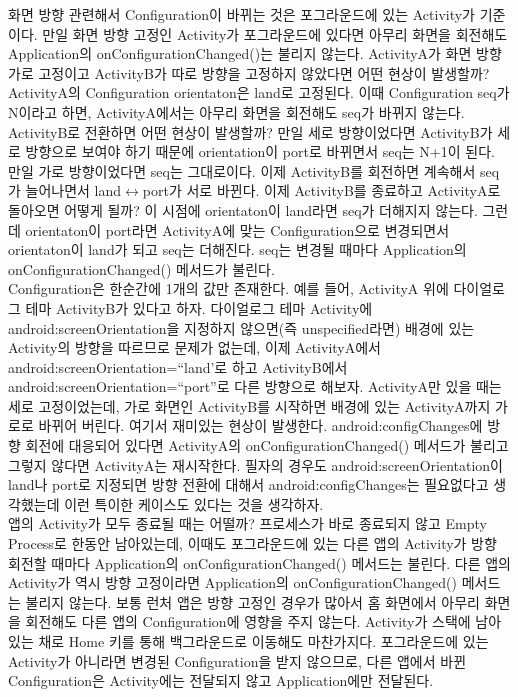 화면 방향 관련해서 Configuration이 바뀌는 것은 포그라운드에 있는 Activity가 기준이다. 
만일 화면 방향 고정인 Activity가 포그라운드에 있다면 아무리 화면을 회전해도 Application의 onConfigurationChanged()는 불리지 않는다. 
ActivityA가 화면 방향 가로 고정이고 ActivityB가 따로 방향을 고정하지 않았다면 어떤 현상이 발생할까? ActivityA의 Configuration orientaton은 land로 고정된다. 
이때 Configuration seq가 N이라고 하면, ActivityA에서는 아무리 화면을 회전해도 seq가 바뀌지 않는다. ActivityB로 전환하면 어떤 현상이 발생할까? 
만일 세로 방향이었다면 ActivityB가 세로 방향으로 보여야 하기 때문에 orientation이 port로 바뀌면서 seq는 N+1이 된다. 
만일 가로 방향이었다면 seq는 그대로이다. 이제 ActivityB를 회전하면 계속해서 seq가 늘어나면서 land$\leftrightarrow$port가 서로 바뀐다. 
이제 ActivityB를 종료하고 ActivityA로 돌아오면 어떻게 될까? 이 시점에 orientaton이 land라면 seq가 더해지지 않는다. 
그런데 orientaton이 port라면 ActivityA에 맞는 Configuration으로 변경되면서 orientaton이 land가 되고 seq는 더해진다. 
seq는 변경될 때마다 Application의 onConfigurationChanged() 메서드가 불린다.\\

Configuration은 한순간에 1개의 값만 존재한다. 예를 들어, ActivityA 위에 다이얼로그 테마 ActivityB가 있다고 하자. 
다이얼로그 테마 Activity에 android:screenOrientation을 지정하지 않으면(즉 unspecified라면) 배경에 있는 Activity의 방향을 따르므로 문제가 없는데, 이제 ActivityA에서 android:screenOrientation=``land'로 하고 ActivityB에서 android:screenOrientation=``port''로 다른 방향으로 해보자. 
ActivityA만 있을 때는 세로 고정이었는데, 가로 화면인 ActivityB를 시작하면 배경에 있는 ActivityA까지 가로로 바뀌어 버린다. 여기서 재미있는 현상이 발생한다. 
android:configChanges에 방향 회전에 대응되어 있다면 ActivityA의 onConfigurationChanged() 메서드가 불리고 그렇지 않다면 ActivityA는 재시작한다. 
필자의 경우도 android:screenOrientation이 land나 port로 지정되면 방향 전환에 대해서 android:configChanges는 필요없다고 생각했는데 이런 특이한 케이스도 있다는 것을 생각하자.\\


앱의 Activity가 모두 종료될 때는 어떨까? 
프로세스가 바로 종료되지 않고 Empty Process로 한동안 남아있는데, 이때도 포그라운드에 있는 다른 앱의 Activity가 방향 회전할 때마다 Application의 onConfigurationChanged() 메서드는 불린다. 
다른 앱의 Activity가 역시 방향 고정이라면 Application의 onConfigurationChanged() 메서드는 불리지 않는다. 
보통 런처 앱은 방향 고정인 경우가 많아서 홈 화면에서 아무리 화면을 회전해도 다른 앱의 Configuration에 영향을 주지 않는다. 
Activity가 스택에 남아있는 채로 Home 키를 통해 백그라운드로 이동해도 마찬가지다. 
포그라운드에 있는 Activity가 아니라면 변경된 Configuration을 받지 않으므로, 다른 앱에서 바뀐 Configuration은 Activity에는 전달되지 않고 Application에만 전달된다.\\

